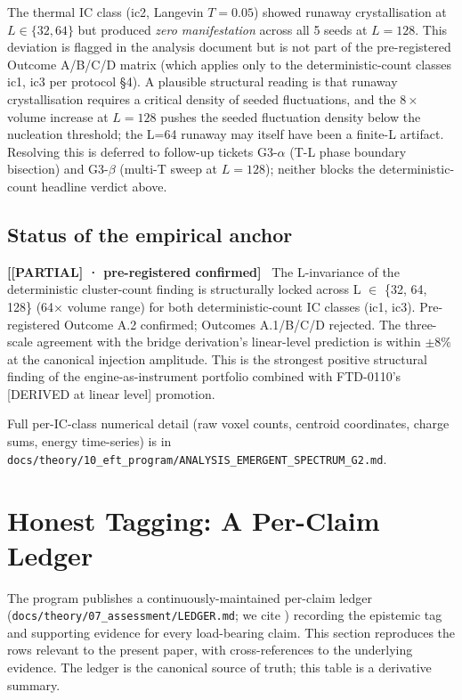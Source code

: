 \documentclass[11pt,reqno]{amsart}
\theoremstyle{plain}
\theoremstyle{definition}
\theoremstyle{remark}
\numberwithin{equation}{section}
\newenvironment{epistemic}[1]{\par\medskip\noindent\textbf{[#1]}\ }{\par\medskip}
\begin{document}
The thermal IC class (ic2, Langevin $T = 0.05$) showed runaway
crystallisation at $L \in \{32, 64\}$ but produced \emph{zero
manifestation} across all 5 seeds at $L = 128$. This deviation is
flagged in the analysis document \cite{analysisg2} but is not part
of the pre-registered Outcome A/B/C/D matrix (which applies only to
the deterministic-count classes ic1, ic3 per protocol §4). A
plausible structural reading is that runaway crystallisation
requires a critical density of seeded fluctuations, and the
$8\times$ volume increase at $L = 128$ pushes the seeded fluctuation
density below the nucleation threshold; the L=64 runaway may
itself have been a finite-L artifact. Resolving this is deferred to
follow-up tickets G3-$\alpha$ (T-L phase boundary bisection) and
G3-$\beta$ (multi-T sweep at $L = 128$); neither blocks the
deterministic-count headline verdict above.

\subsection{Status of the empirical anchor}

\begin{epistemic}{[PARTIAL] · pre-registered confirmed}
The L-invariance of the deterministic cluster-count finding is
structurally locked across L $\in$ \{32, 64, 128\} (64$\times$
volume range) for both deterministic-count IC classes (ic1, ic3).
Pre-registered Outcome A.2 confirmed; Outcomes A.1/B/C/D rejected.
The three-scale agreement with the bridge derivation's linear-level
prediction is within $\pm 8\%$ at the canonical injection amplitude.
This is the strongest positive structural finding of the
engine-as-instrument portfolio combined with FTD-0110's [DERIVED at
linear level] promotion.
\end{epistemic}

Full per-IC-class numerical detail (raw voxel counts, centroid
coordinates, charge sums, energy time-series) is in
\texttt{docs/theory/10\_eft\_program/ANALYSIS\_EMERGENT\_SPECTRUM\_G2.md}.

\section{Honest Tagging: A Per-Claim Ledger}
\label{sec:tagging}

The program publishes a continuously-maintained per-claim ledger
(\texttt{docs/theory/07\_assessment/LEDGER.md}; we cite
\cite{ledger}) recording the epistemic tag and supporting evidence
for every load-bearing claim. This section reproduces the rows
relevant to the present paper, with cross-references to the
underlying evidence. The ledger is the canonical source of truth;
this table is a derivative summary.
\end{document}
